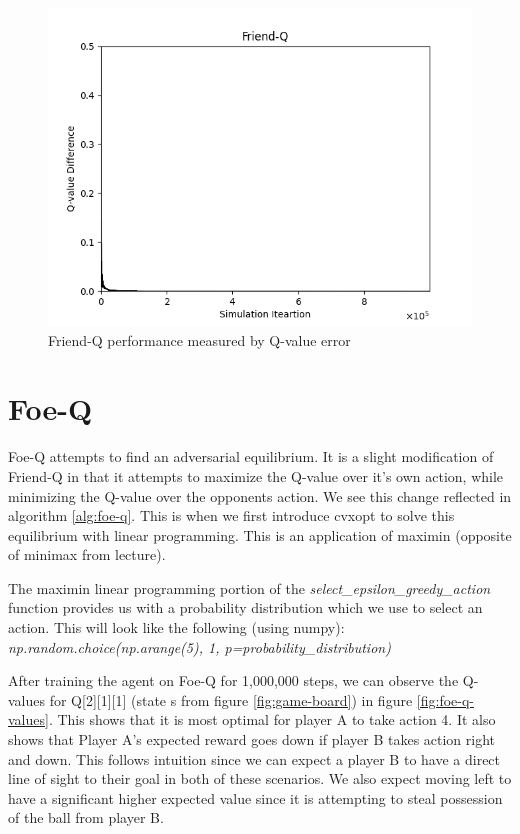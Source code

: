 \documentclass[conference]{IEEEtran}
\begin{document}
\begin{figure}[]
    \centering
    \includegraphics[scale=0.45]{figs/Friend-Q}
    \caption{Friend-Q performance measured by Q-value error}
    \label{fig:friend-q}
\end{figure}

\section{Foe-Q}
Foe-Q attempts to find an adversarial equilibrium. It is a slight modification of Friend-Q in that it attempts to maximize the Q-value over it's own action, while minimizing the Q-value over the opponents action. We see this change reflected in algorithm \ref{alg:foe-q}. This is when we first introduce cvxopt to solve this equilibrium with linear programming. This is an application of maximin (opposite of minimax from lecture).

The maximin linear programming portion of the \textit{select\_epsilon\_greedy\_action} function provides us with a probability distribution which we use to select an action. This will look like the following (using numpy): \textit{np.random.choice(np.arange(5), 1, p=probability\_distribution)}

After training the agent on Foe-Q for 1,000,000 steps, we can observe the Q-values for Q[2][1][1] (state s from figure \ref{fig:game-board}) in figure \ref{fig:foe-q-values}. This shows that it is most optimal for player A to take action 4. It also shows that Player A's expected reward goes down if player B takes action right and down. This follows intuition since we can expect a player B to have a direct line of sight to their goal in both of these scenarios. We also expect moving left to have a significant higher expected value since it is attempting to steal possession of the ball from player B.
\end{document}
